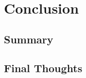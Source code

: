 \chapter{Conclusion}
\begin{comment}
    FRA PRESENTASJON OM KONKLUSJON:
    1. Gå tilbake til temaet
    2. Gjenoppgi hovedpåstanden eller gjenta problemstillingen
    3. Oppsummering av ideene som er diskutert
    4. Oppsummerende sluttpoeng:
        - Forsterke hovedbudskapet
        - Gi en tankevekker eller refleksjon
        - Peke på videre implikasjoner
\end{comment}
\section{Summary}
\section{Final Thoughts}